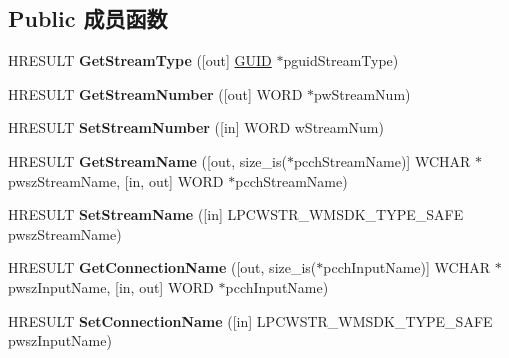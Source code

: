 \subsection*{Public 成员函数}
\begin{DoxyCompactItemize}
\item 
\mbox{\label{interface_i_w_m_stream_config_a125fc4ce0651cf58bfdfbb21d3284e98}} 
H\+R\+E\+S\+U\+LT {\bfseries Get\+Stream\+Type} (\mbox{[}out\mbox{]} \hyperlink{interface_g_u_i_d}{G\+U\+ID} $\ast$pguid\+Stream\+Type)
\item 
\mbox{\label{interface_i_w_m_stream_config_a91abd91d4339fbedc98c50ee42e6cd40}} 
H\+R\+E\+S\+U\+LT {\bfseries Get\+Stream\+Number} (\mbox{[}out\mbox{]} W\+O\+RD $\ast$pw\+Stream\+Num)
\item 
\mbox{\label{interface_i_w_m_stream_config_a215417e07872bb75c33bfbacbd66d9c7}} 
H\+R\+E\+S\+U\+LT {\bfseries Set\+Stream\+Number} (\mbox{[}in\mbox{]} W\+O\+RD w\+Stream\+Num)
\item 
\mbox{\label{interface_i_w_m_stream_config_a68747ba1b1a6e4c97bb26c4931d40c79}} 
H\+R\+E\+S\+U\+LT {\bfseries Get\+Stream\+Name} (\mbox{[}out, size\+\_\+is($\ast$pcch\+Stream\+Name)\mbox{]} W\+C\+H\+AR $\ast$pwsz\+Stream\+Name, \mbox{[}in, out\mbox{]} W\+O\+RD $\ast$pcch\+Stream\+Name)
\item 
\mbox{\label{interface_i_w_m_stream_config_a17b3a53f9b2dc03df77b9346caea9409}} 
H\+R\+E\+S\+U\+LT {\bfseries Set\+Stream\+Name} (\mbox{[}in\mbox{]} L\+P\+C\+W\+S\+T\+R\+\_\+\+W\+M\+S\+D\+K\+\_\+\+T\+Y\+P\+E\+\_\+\+S\+A\+FE pwsz\+Stream\+Name)
\item 
\mbox{\label{interface_i_w_m_stream_config_af98e5ef5d77adb8b107a749385c56954}} 
H\+R\+E\+S\+U\+LT {\bfseries Get\+Connection\+Name} (\mbox{[}out, size\+\_\+is($\ast$pcch\+Input\+Name)\mbox{]} W\+C\+H\+AR $\ast$pwsz\+Input\+Name, \mbox{[}in, out\mbox{]} W\+O\+RD $\ast$pcch\+Input\+Name)
\item 
\mbox{\label{interface_i_w_m_stream_config_a340e606226f306c9895685c9c8b99654}} 
H\+R\+E\+S\+U\+LT {\bfseries Set\+Connection\+Name} (\mbox{[}in\mbox{]} L\+P\+C\+W\+S\+T\+R\+\_\+\+W\+M\+S\+D\+K\+\_\+\+T\+Y\+P\+E\+\_\+\+S\+A\+FE pwsz\+Input\+Name)

\end{DoxyCompactItemize}
